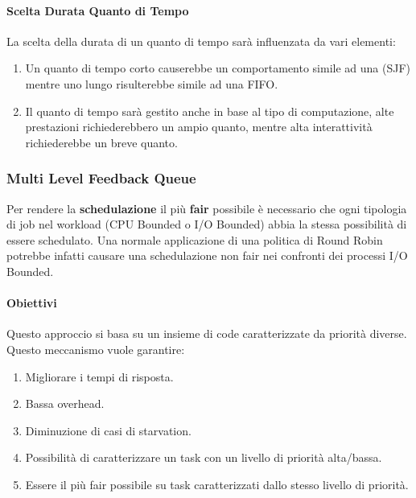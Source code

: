 \documentclass{article}
\begin{document}
\begin{enumerate}
\begin{enumerate}
    \paragraph{Scelta Durata Quanto di Tempo} La scelta della durata di un quanto di tempo sarà influenzata da vari elementi:
    \begin{enumerate}
        \item Un quanto di tempo corto causerebbe un comportamento simile ad una (SJF) mentre uno lungo risulterebbe simile ad una FIFO.
        \item Il quanto di tempo sarà gestito anche in base al tipo di computazione, alte prestazioni richiederebbero un ampio quanto, mentre alta interattività richiederebbe un breve quanto.
    \end{enumerate}
    \end{enumerate}
\end{enumerate}

\newpage

\subsubsection{Multi Level Feedback Queue}

Per rendere la \textbf{schedulazione} il più \textbf{fair} possibile è necessario che ogni tipologia
di job nel workload (CPU Bounded o I/O Bounded) abbia la stessa possibilità di essere schedulato.
Una normale applicazione di una politica di Round Robin potrebbe infatti causare una schedulazione non fair nei confronti
dei processi I/O Bounded.

\paragraph{Obiettivi} Questo approccio si basa su un insieme di code caratterizzate da priorità diverse. Questo meccanismo vuole garantire:

\begin{enumerate}
    \item Migliorare i tempi di risposta.
    \item Bassa overhead.
    \item Diminuzione di casi di starvation.
    \item Possibilità di caratterizzare un task con un livello di priorità alta/bassa.
    \item Essere il più fair possibile su task caratterizzati dallo stesso livello di priorità.
\end{enumerate}
\end{document}
